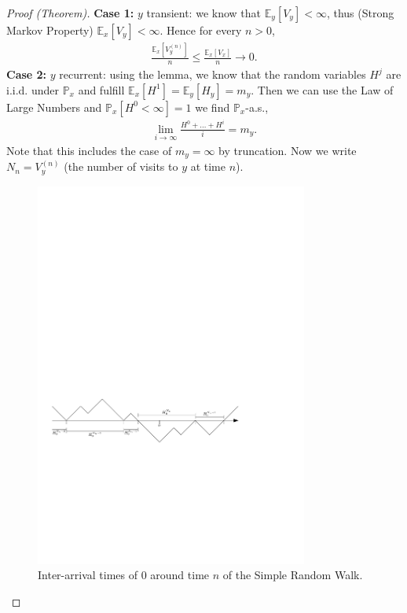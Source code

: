 \begin{proof}[Proof (Theorem)]
	\textbf{Case 1:} $y$ transient:	we know that $\mathbb{E}_{y} \left[ V_y \right] < \infty$, thus (Strong Markov Property) $\mathbb{E}_{x} \left[ V_y \right] < \infty$. Hence for every $n> 0$,
	\begin{align}
		\frac{\mathbb{E}_{x} \left[ V_y^{(n)} \right] }{n} \leq \frac{\mathbb{E}_{x} \left[ V_x \right] }{n} \to 0
	.\end{align}
	\textbf{Case 2:} $y$ recurrent: using the lemma, we know that the random variables $H^j$ are i.i.d. under $\mathbb{P}_{x}$ and fulfill $\mathbb{E}_{x} \left[ H^1 \right] = \mathbb{E}_{y} \left[ H_y \right]  = m_y$. Then we can use the Law of Large Numbers and $\mathbb{P}_{x} \left[ H^0 < \infty \right] =1$ we find $\mathbb{P}_{x}$-a.s.,
	\begin{align}
		\lim_{i\to \infty } \frac{H^0 + \ldots + H^i}{i} = m_y
	.\end{align}
	Note that this includes the case of $m_y=\infty$ by truncation. Now we write $N_n = V_y^{(n)}$ (the number of visits to $y$ at time $n$).
	\begin{figure}[h!]
		\centering
		\includegraphics[width=0.8\textwidth]{figures/inter_arrival_ineq.pdf}
		\caption{Inter-arrival times of $0$ around time $n$ of the Simple Random Walk.}
	\end{figure}


\end{proof}

